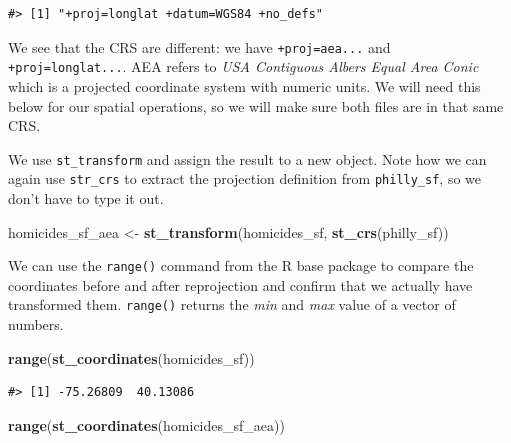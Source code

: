 \documentclass[
]{book}
\newenvironment{Shaded}{\begin{snugshade}}{\end{snugshade}}
\newcommand{\FunctionTok}[1]{\textcolor[rgb]{0.13,0.29,0.53}{\textbf{#1}}}
\newcommand{\NormalTok}[1]{#1}
\newcommand{\OtherTok}[1]{\textcolor[rgb]{0.56,0.35,0.01}{#1}}
\newcommand{\SpecialCharTok}[1]{\textcolor[rgb]{0.81,0.36,0.00}{\textbf{#1}}}
\begin{document}
\begin{Shaded}
\end{Shaded}

\begin{verbatim}
#> [1] "+proj=longlat +datum=WGS84 +no_defs"
\end{verbatim}

We see that the CRS are different: we have \texttt{+proj=aea...} and \texttt{+proj=longlat...}. AEA refers to \emph{USA Contiguous Albers Equal Area Conic} which is a projected coordinate system with numeric units. We will need this below for our spatial operations, so we will make sure both files are in that same CRS.

We use \texttt{st\_transform} and assign the result to a new object. Note how we can again use \texttt{str\_crs} to extract the projection definition from \texttt{philly\_sf}, so we don't have to type it out.

\begin{Shaded}
\begin{Highlighting}[]
\NormalTok{homicides\_sf\_aea }\OtherTok{\textless{}{-}} \FunctionTok{st\_transform}\NormalTok{(homicides\_sf, }\FunctionTok{st\_crs}\NormalTok{(philly\_sf))}
\end{Highlighting}
\end{Shaded}

We can use the \texttt{range()} command from the R base package to compare the coordinates before and after reprojection and confirm that we actually have transformed them. \texttt{range()} returns the \emph{min} and \emph{max} value of a vector of numbers.

\begin{Shaded}
\begin{Highlighting}[]
\FunctionTok{range}\NormalTok{(}\FunctionTok{st\_coordinates}\NormalTok{(homicides\_sf))}
\end{Highlighting}
\end{Shaded}

\begin{verbatim}
#> [1] -75.26809  40.13086
\end{verbatim}

\begin{Shaded}
\begin{Highlighting}[]
\FunctionTok{range}\NormalTok{(}\FunctionTok{st\_coordinates}\NormalTok{(homicides\_sf\_aea))}
\end{Highlighting}
\end{Shaded}
\end{document}
